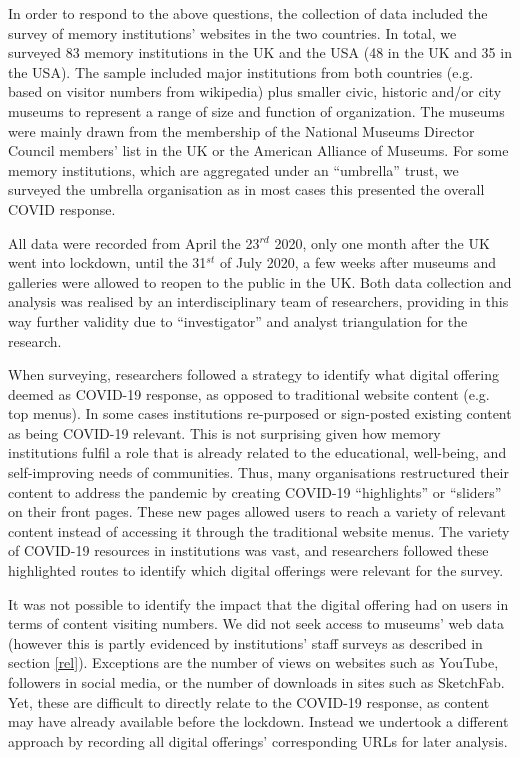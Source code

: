\documentclass{egpubl}
\begin{document}
In order to respond to the above questions, the collection of data included the survey of memory institutions' websites in the two countries. In total, we surveyed 83 memory institutions in the UK and the USA (48 in the  UK and 35 in the USA). The sample included major institutions from both countries (e.g. based on visitor numbers from wikipedia) \cite{Wikipedia} plus smaller civic, historic and/or city museums to represent a range of size and function of organization. The museums were mainly drawn from the membership of the National Museums Director Council members' list in the UK \cite{nationalmuseums:2020} or the American Alliance of Museums. For some memory institutions, which are aggregated under an ``umbrella'' trust, we surveyed the umbrella organisation as in most cases this presented the overall COVID response.

All data were recorded from April the 23$^{rd}$  2020, only one month after the UK went into lockdown, until the 31$^{st}$ of July 2020, a few weeks after museums and galleries were allowed to reopen to the public in the UK. Both data collection and analysis was realised by an interdisciplinary team of researchers, providing in this way further validity due to ``investigator'' and analyst triangulation for the research.


When surveying, researchers followed a strategy to identify what digital offering deemed as COVID-19 response, as opposed to traditional website content (e.g. top menus). In some cases institutions re-purposed or sign-posted existing content as being COVID-19 relevant. This is not surprising given how memory institutions fulfil a role that is already related to the educational, well-being, and self-improving needs of communities. Thus, many organisations restructured their content to address the pandemic by creating COVID-19 ``highlights'' or ``sliders'' on their front pages. These new pages allowed users to reach a variety of relevant content instead of accessing it through the traditional website menus. The variety of COVID-19 resources in institutions was vast, and researchers followed these highlighted routes to identify which digital offerings were relevant for the survey. 

It was not possible to identify the impact that the digital offering had on users in terms of content visiting numbers. We did not seek access to museums’ web data (however this is partly evidenced by institutions' staff surveys as described in section \ref{rel}). Exceptions are the number of views on websites such as YouTube, followers in social media, or the number of downloads in sites such as SketchFab. Yet, these are difficult to directly relate to the COVID-19 response, as content may have already available before the lockdown. Instead we undertook a different approach by recording all digital offerings' corresponding URLs for later analysis. 
\end{document}
